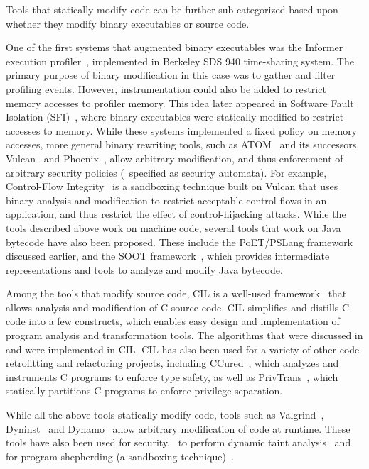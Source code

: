 Tools that statically modify code can be further sub-categorized based upon
whether they modify binary executables or source code.

One of the first systems that augmented binary executables was the Informer
execution profiler~\cite{dg71}, implemented in Berkeley SDS 940 time-sharing
system. The primary purpose of binary modification in this case was to gather
and filter profiling events. However, instrumentation could also be added to
restrict memory accesses to profiler memory. This idea later appeared in
Software Fault Isolation (SFI)~\cite{wla+93}, where binary executables were
statically modified to restrict accesses to memory. While these systems
implemented a fixed policy on memory accesses, more general binary rewriting
tools, such as ATOM~\cite{se94} and its successors, Vulcan~\cite{esv01} and
Phoenix~\cite{phoenix}, allow arbitrary modification, and thus enforcement of
arbitrary security policies (\eg~specified as security automata). For example,
Control-Flow Integrity~\cite{abe+05} is a sandboxing technique built on Vulcan
that uses binary analysis and modification to restrict acceptable control flows
in an application, and thus restrict the effect of control-hijacking attacks.
While the tools described above work on machine code, several tools that work
on Java bytecode have also been proposed. These include the PoET/PSLang
framework~\cite{e04} discussed earlier, and the SOOT framework~\cite{soot},
which provides intermediate representations and tools to analyze and modify
Java bytecode.

Among the tools that modify source code, CIL is a well-used
framework~\cite{nmr+02} that allows analysis and modification of C source code.
CIL simplifies and distills C code into a few constructs, which enables easy
design and implementation of program analysis and transformation tools.  The
algorithms that were discussed in  and
 were implemented in CIL. CIL has also been used for
a variety of other code retrofitting and refactoring projects, including
CCured~\cite{nch+05, nmw02}, which analyzes and instruments C programs to
enforce type safety, as well as PrivTrans~\cite{bs04}, which statically
partitions C programs to enforce privilege separation. 

While all the above tools statically modify code, tools such as
Valgrind~\cite{ns07}, Dyninst~\cite{dyninst,hmc94} and Dynamo~\cite{bdb00}
allow arbitrary modification of code at runtime. These tools have also been
used for security, \eg~to perform dynamic taint analysis~\cite{ns05} and for
program shepherding (a sandboxing technique)~\cite{kba02}.

